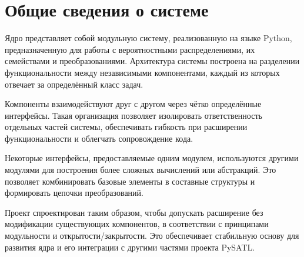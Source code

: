 \section{Общие сведения о системе}
Ядро представляет собой модульную систему, реализованную на языке Python, предназначенную для работы с вероятностными распределениями, их семействами и преобразованиями. Архитектура системы построена на разделении функциональности между независимыми компонентами, каждый из которых отвечает за определённый класс задач.

Компоненты взаимодействуют друг с другом через чётко определённые интерфейсы. Такая организация позволяет изолировать ответственность отдельных частей системы, обеспечивать гибкость при расширении функциональности и облегчать сопровождение кода.

Некоторые интерфейсы, предоставляемые одним модулем, используются другими модулями для построения более сложных вычислений или абстракций. Это позволяет комбинировать базовые элементы в составные структуры и формировать цепочки преобразований.

Проект спроектирован таким образом, чтобы допускать расширение без модификации существующих компонентов, в соответствии с принципами модульности и открытости/закрытости. Это обеспечивает стабильную основу для развития ядра и его интеграции с другими частями проекта PySATL.
